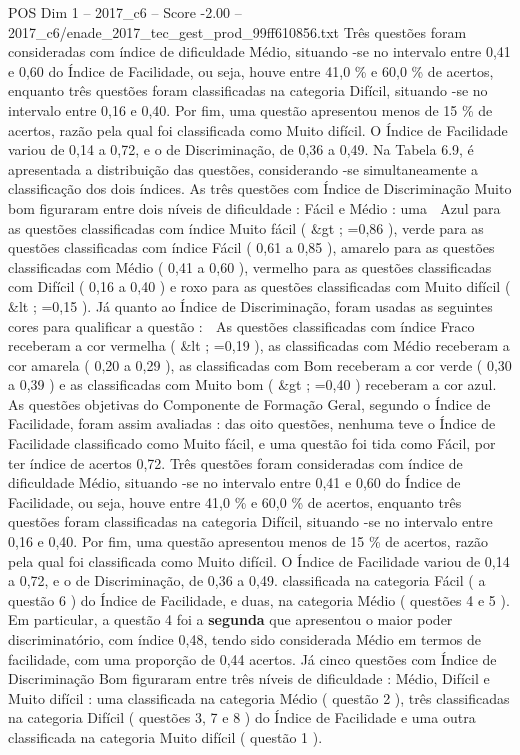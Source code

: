 \begin{textsample}{POS Dim 1 – 2017\_c6 – Score -2.00 – 2017\_c6/enade\_2017\_tec\_gest\_prod\_99ff610856.txt}
Três questões foram consideradas com índice de dificuldade Médio, situando -se no intervalo entre 0,41 e 0,60 do Índice de Facilidade, ou seja, houve entre 41,0 \% e 60,0 \% de acertos, enquanto três questões foram classificadas na categoria Difícil, situando -se no intervalo entre 0,16 e 0,40.
Por fim, uma questão apresentou menos de 15 \% de acertos, razão pela qual foi classificada como Muito difícil.
O Índice de Facilidade variou de 0,14 a 0,72, e o de Discriminação, de 0,36 a 0,49.
Na Tabela 6.9, é apresentada a distribuição das questões, considerando -se simultaneamente a classificação dos dois índices.
As três questões com Índice de Discriminação Muito bom figuraram entre dois níveis de dificuldade : Fácil e Médio : uma  Azul para as questões classificadas com índice Muito fácil ( \&gt ; =0,86 ), verde para as questões classificadas com índice Fácil ( 0,61 a 0,85 ), amarelo para as questões classificadas com Médio ( 0,41 a 0,60 ), vermelho para as questões classificadas com Difícil ( 0,16 a 0,40 ) e roxo para as questões classificadas com Muito difícil ( \&lt ; =0,15 ).
Já quanto ao Índice de Discriminação, foram usadas as seguintes cores para qualificar a questão :  As questões classificadas com índice Fraco receberam a cor vermelha ( \&lt ; =0,19 ), as classificadas com Médio receberam a cor amarela ( 0,20 a 0,29 ), as classificadas com Bom receberam a cor verde ( 0,30 a 0,39 ) e as classificadas com Muito bom ( \&gt ; =0,40 ) receberam a cor azul.
As questões objetivas do Componente de Formação Geral, segundo o Índice de Facilidade, foram assim avaliadas : das oito questões, nenhuma teve o Índice de Facilidade classificado como Muito fácil, e uma questão foi tida como Fácil, por ter índice de acertos 0,72.
Três questões foram consideradas com índice de dificuldade Médio, situando -se no intervalo entre 0,41 e 0,60 do Índice de Facilidade, ou seja, houve entre 41,0 \% e 60,0 \% de acertos, enquanto três questões foram classificadas na categoria Difícil, situando -se no intervalo entre 0,16 e 0,40.
Por fim, uma questão apresentou menos de 15 \% de acertos, razão pela qual foi classificada como Muito difícil.
O Índice de Facilidade variou de 0,14 a 0,72, e o de Discriminação, de 0,36 a 0,49. classificada na categoria Fácil ( a questão 6 ) do Índice de Facilidade, e duas, na categoria Médio ( questões 4 e 5 ).
Em particular, a questão 4 foi a \textbf{segunda} que apresentou o maior poder discriminatório, com índice 0,48, tendo sido considerada Médio em termos de facilidade, com uma proporção de 0,44 acertos.
Já cinco questões com Índice de Discriminação Bom figuraram entre três níveis de dificuldade : Médio, Difícil e Muito difícil : uma classificada na categoria Médio ( questão 2 ), três classificadas na categoria Difícil ( questões 3, 7 e 8 ) do Índice de Facilidade e uma outra classificada na categoria Muito difícil ( questão 1 ).

\end{textsample}
